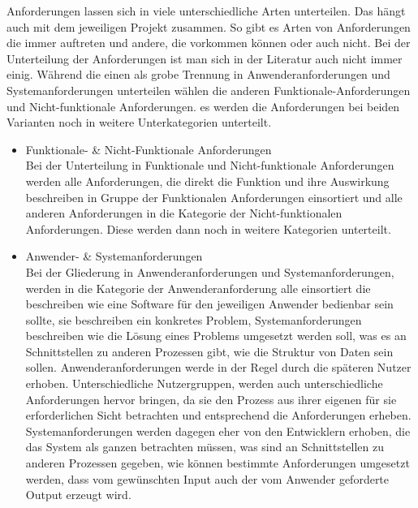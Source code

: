 Anforderungen lassen sich in viele unterschiedliche Arten unterteilen. Das hängt auch mit dem jeweiligen Projekt zusammen. So gibt es Arten von Anforderungen die immer auftreten und andere, die vorkommen können oder auch nicht.  
Bei der Unterteilung der Anforderungen ist man sich in der Literatur auch nicht immer einig. Während die einen als grobe Trennung in Anwenderanforderungen und Systemanforderungen unterteilen\autocite{AM} wählen die anderen Funktionale-Anforderungen und Nicht-funktionale Anforderungen\autocite{100minAM}\autocite{AMin.sieben.T}. es werden die Anforderungen bei beiden Varianten noch in weitere Unterkategorien unterteilt.

\begin{itemize}

\item Funktionale- \& Nicht-Funktionale Anforderungen\\
Bei der Unterteilung in Funktionale und Nicht-funktionale Anforderungen werden alle Anforderungen, die direkt die Funktion und ihre Auswirkung beschreiben in Gruppe der Funktionalen Anforderungen einsortiert und alle anderen Anforderungen in die Kategorie der Nicht-funktionalen Anforderungen. Diese werden dann noch in weitere Kategorien unterteilt. 

\item Anwender- \& Systemanforderungen\\
Bei der Gliederung in Anwenderanforderungen und Systemanforderungen, werden in die Kategorie der Anwenderanforderung alle einsortiert die beschreiben wie eine Software für den jeweiligen Anwender bedienbar sein sollte, sie beschreiben ein konkretes Problem\autocite{AM}, Systemanforderungen beschreiben wie die Lösung eines Problems umgesetzt werden soll, was es an Schnittstellen zu anderen Prozessen gibt, wie die Struktur von Daten sein sollen.
Anwenderanforderungen werde in der Regel durch die späteren Nutzer erhoben. Unterschiedliche Nutzergruppen, werden auch unterschiedliche Anforderungen hervor bringen, da sie den Prozess aus ihrer eigenen für sie erforderlichen Sicht betrachten und entsprechend die Anforderungen erheben. Systemanforderungen werden dagegen eher von den Entwicklern erhoben, die das System als ganzen betrachten müssen, was sind an Schnittstellen zu anderen Prozessen gegeben, wie können bestimmte Anforderungen umgesetzt werden, dass vom gewünschten Input auch der vom Anwender geforderte Output erzeugt wird. 


\end{itemize}

